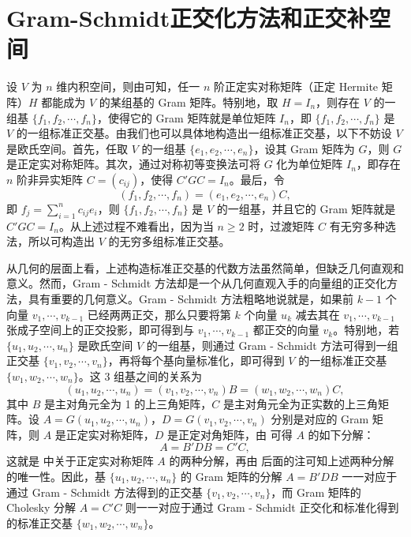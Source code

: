 \documentclass[../../main.tex]{subfiles}
\begin{document}
\section{Gram-Schmidt正交化方法和正交补空间}

设 $V$ 为 $n$ 维内积空间，则由可知，任一 $n$ 阶正定实对称矩阵（正定 Hermite 矩阵）$H$ 都能成为 $V$ 的某组基的 Gram 矩阵。特别地，取 $H = I_n$，则存在 $V$ 的一组基 $\{f_1,f_2,\cdots,f_n\}$，使得它的 Gram 矩阵就是单位矩阵 $I_n$，即 $\{f_1,f_2,\cdots,f_n\}$ 是 $V$ 的一组标准正交基。由我们也可以具体地构造出一组标准正交基，以下不妨设 $V$ 是欧氏空间。首先，任取 $V$ 的一组基 $\{e_1,e_2,\cdots,e_n\}$，设其 Gram 矩阵为 $G$，则 $G$ 是正定实对称矩阵。其次，通过对称初等变换法可将 $G$ 化为单位矩阵 $I_n$，即存在 $n$ 阶非异实矩阵 $C = (c_{ij})$，使得 $C'GC = I_n$。最后，令
\[
(f_1,f_2,\cdots,f_n)=(e_1,e_2,\cdots,e_n)C,
\]
即 $f_j = \sum_{i = 1}^{n}c_{ij}e_i$，则 $\{f_1,f_2,\cdots,f_n\}$ 是 $V$ 的一组基，并且它的 Gram 矩阵就是 $C'GC = I_n$。从上述过程不难看出，因为当 $n\geq2$ 时，过渡矩阵 $C$ 有无穷多种选法，所以可构造出 $V$ 的无穷多组标准正交基。

从几何的层面上看，上述构造标准正交基的代数方法虽然简单，但缺乏几何直观和意义。然而，Gram - Schmidt 方法却是一个从几何直观入手的向量组的正交化方法，具有重要的几何意义。Gram - Schmidt 方法粗略地说就是，如果前 $k - 1$ 个向量 $v_1,\cdots,v_{k - 1}$ 已经两两正交，那么只要将第 $k$ 个向量 $u_k$ 减去其在 $v_1,\cdots,v_{k - 1}$ 张成子空间上的正交投影，即可得到与 $v_1,\cdots,v_{k - 1}$ 都正交的向量 $v_k$。特别地，若 $\{u_1,u_2,\cdots,u_n\}$ 是欧氏空间 $V$ 的一组基，则通过 Gram - Schmidt 方法可得到一组正交基 $\{v_1,v_2,\cdots,v_n\}$，再将每个基向量标准化，即可得到 $V$ 的一组标准正交基 $\{w_1,w_2,\cdots,w_n\}$。这 3 组基之间的关系为
\[
(u_1,u_2,\cdots,u_n)=(v_1,v_2,\cdots,v_n)B=(w_1,w_2,\cdots,w_n)C,
\]
其中 $B$ 是主对角元全为 1 的上三角矩阵，$C$ 是主对角元全为正实数的上三角矩阵。设 $A = G(u_1,u_2,\cdots,u_n)$，$D = G(v_1,v_2,\cdots,v_n)$ 分别是对应的 Gram 矩阵，则 $A$ 是正定实对称矩阵，$D$ 是正定对角矩阵，由 可得 $A$ 的如下分解：
\[
A = B'DB = C'C,
\]
这就是 中关于正定实对称矩阵 $A$ 的两种分解，再由 后面的注可知上述两种分解的唯一性。因此，基 $\{u_1,u_2,\cdots,u_n\}$ 的 Gram 矩阵的分解 $A = B'DB$ 一一对应于通过 Gram - Schmidt 方法得到的正交基 $\{v_1,v_2,\cdots,v_n\}$，而 Gram 矩阵的 Cholesky 分解 $A = C'C$ 则一一对应于通过 Gram - Schmidt 正交化和标准化得到的标准正交基 $\{w_1,w_2,\cdots,w_n\}$。
\end{document}
